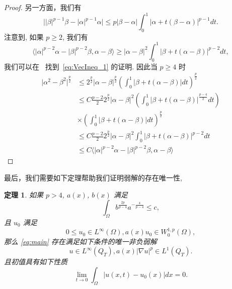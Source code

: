 \documentclass[twoside,longtitle]{LZUthesis}
\newtheorem{theorem}{定理}[chapter]
\theoremstyle{definition}
\numberwithin{equation}{chapter}
\newcommand*\abs[1]{\lvert#1\rvert}
\begin{document}
\begin{proof}
	另一方面，我们有
	\begin{equation}
		\abs{\abs{\beta}^{p-1}\beta - \abs{\alpha}^{p-1}\alpha} \leq p\abs{\beta-\alpha}\int_0^1 \abs{\alpha + t(\beta - \alpha)}^{p-1}dt.
	\end{equation}
	注意到, 如果 $p \geq 2$, 我们有
	\begin{equation}\label{eq:VecIneq_1}
		\langle \abs{\alpha}^{p-2}\alpha - \abs{\beta}^{p-2}\beta, \alpha-\beta\rangle
		\geq \abs{\alpha-\beta}^2\int_0^1 \abs{\beta + t(\alpha - \beta)}^{p-2}dt,
	\end{equation}
	我们可以在~\cite{lindqvistNotesStationaryPLaplace2019} 找到~\cref{eq:VecIneq_1} 的证明.
	因此当 $p \geq 4$ 时
	\begin{equation}
		\begin{split}
			\abs{\alpha^2 - \beta^2}^{\frac{p}{2}}
			&\leq 2^{\frac{p}{2}}\abs{\alpha-\beta}^{\frac{p}{2}}
			\left(\int_0^1 \abs{\beta + t(\alpha - \beta)}dt\right)^{\frac{p}{2}}\\
			&\leq C\frac{p-2}{2}2^{\frac{p}{2}}\abs{\alpha-\beta}^2
			\left(\int_0^1 \abs{\beta + t(\alpha - \beta)}^{\frac{p-4}{2}}dt\right)\\
			&\times\left(\int_0^1 \abs{\beta + t(\alpha - \beta)}dt\right)^{\frac{p}{2}}\\
			&\leq C\frac{p-2}{2}2^{\frac{p}{2}}\abs{\alpha-\beta}^2
			\int_0^1 \abs{\beta + t(\alpha - \beta)}^{p-2}dt\\
			&\leq C \langle \abs{\alpha}^{p-2}\alpha - \abs{\beta}^{p-2}\beta, \alpha-\beta\rangle
		\end{split}
	\end{equation}
\end{proof}

最后，我们需要如下定理帮助我们证明弱解的存在唯一性,
\begin{theorem}\cite[定理 1.3 和 1.6]{Zhan2019Uniquenessa}\label{thm:zhan}
	如果 $p>4$, $a(x)$, $b(x)$ 满足
	\begin{equation}\label{eq:zhan_intcondition}
		\int_{\Omega} b^{\frac{2p}{p-4}}a^{-\frac{4}{p-4}} \leq c,
	\end{equation}
	且 $u_0$ 满足
	\begin{equation}\label{eq:zhan_initdata}
		0 \leq u_0 \in L^{\infty}(\Omega), a(x)u_0 \in W_0^{1,p}(\Omega),
	\end{equation}
	那么 \cref{eq:main} 存在满足如下条件的唯一非负弱解
	\begin{equation}
		u \in L^{\infty}(Q_T), a(x)\abs{\nabla u}^p \in L^1(Q_T).
	\end{equation}
	且初值具有如下性质
	\begin{equation}
		\lim_{t \to 0}\int_{\Omega}\abs{u(x,t) - u_0(x)}dx = 0.
	\end{equation}
\end{theorem}
\end{document}
